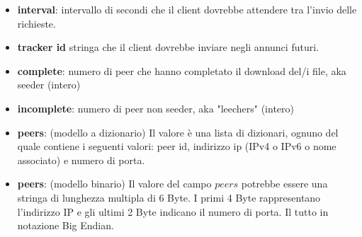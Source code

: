 \documentclass[a4]{book}
\begin{document}
\begin{itemize}
	\item \textbf{interval}: intervallo di secondi che il client dovrebbe attendere tra l'invio delle richieste.
	\item \textbf{tracker id} stringa che il client dovrebbe inviare negli annunci futuri.
	\item \textbf{complete}: numero di peer che hanno completato il download del/i file, aka seeder (intero)
	\item \textbf{incomplete}: numero di peer non seeder, aka "leechers" (intero)
	\item \textbf{peers}: (modello a dizionario) Il valore è una lista di dizionari, ognuno del quale contiene i seguenti valori: peer id, indirizzo ip (IPv4 o IPv6 o nome associato) e numero di porta.	
	\item \textbf{peers}: (modello binario) Il valore del campo $peers$ potrebbe essere una stringa di lunghezza multipla di 6 Byte. I primi 4 Byte rappresentano l'indirizzo IP e gli ultimi 2 Byte indicano il numero di porta. Il tutto in notazione Big Endian.\newline
\end{itemize}
\end{document}
